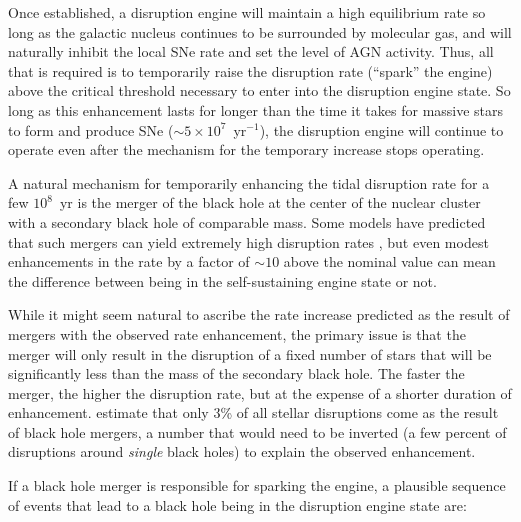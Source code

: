 \documentclass[preprint2]{aastex}
\begin{document}
Once established, a disruption engine will maintain a high equilibrium rate so long as the galactic nucleus continues to be surrounded by molecular gas, and will naturally inhibit the local SNe rate and set the level of AGN activity. Thus, all that is required is to temporarily raise the disruption rate (``spark'' the engine) above the critical threshold necessary to enter into the disruption engine state. So long as this enhancement lasts for longer than the time it takes for massive stars to form and produce SNe ($\sim 5 \times 10^{7}$~yr$^{-1}$), the disruption engine will continue to operate even after the mechanism for the temporary increase stops operating.

A natural mechanism for temporarily enhancing the tidal disruption rate for a few $10^{8}$~yr is the merger of the black hole at the center of the nuclear cluster with a secondary black hole of comparable mass. Some models have predicted that such mergers can yield extremely high disruption rates \citep{Chen:2009a}, but even modest enhancements in the rate by a factor of $\sim 10$ above the nominal value can mean the difference between being in the self-sustaining engine state or not.

While it might seem natural to ascribe the rate increase predicted as the result of mergers with the observed rate enhancement, the primary issue is that the merger will only result in the disruption of a fixed number of stars that will be significantly less than the mass of the secondary black hole. The faster the merger, the higher the disruption rate, but at the expense of a shorter duration of enhancement. \citet{Wegg:2011a} estimate that only 3\% of all stellar disruptions come as the result of black hole mergers, a number that would need to be inverted (a few percent of disruptions around {\it single} black holes) to explain the observed enhancement.

If a black hole merger is responsible for sparking the engine, a plausible sequence of events that lead to a black hole being in the disruption engine state are:
\end{document}
